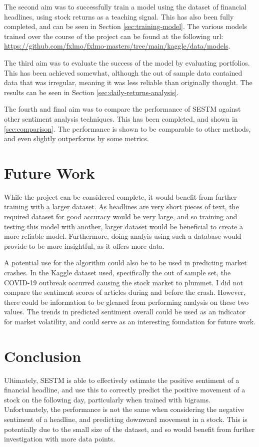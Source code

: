 The second aim was to successfully train a model using the dataset of financial headlines, using stock returns as a teaching signal. This has also been fully completed, and can be seen in Section \ref{sec:training-model}. The various models trained over the course of the project can be found at the following url: \url{https://github.com/fxlmo/fxlmo-masters/tree/main/kaggle/data/models}.

The third aim was to evaluate the success of the model by evaluating portfolios. This has been achieved somewhat, although the out of sample data contained data that was irregular, meaning it was less reliable than originally thought. The results can be seen in Section \ref{sec:daily-returns-analysis}. 

The fourth and final aim was to compare the performance of SESTM against other sentiment analysis techniques. This has been completed, and shown in \ref{sec:comparison}. The performance is shown to be comparable to other methods, and even slightly outperforms by some metrics.

\section{Future Work}
While the project can be considered complete, it would benefit from further training with a larger dataset. As headlines are very short pieces of text, the required dataset for good accuracy would be very large, and so training and testing this model with another, larger dataset would be beneficial to create a more reliable model. Furthermore, doing analyis using such a database would provide to be more insightful, as it offers more data.

A potential use for the algorithm could also be to be used in predicting market crashes. In the Kaggle dataset used, specifically the out of sample set, the COVID-19 outbreak occurred causing the stock market to plummet. I did not compare the sentiment scores of articles during and before the crash. However, there could be information to be gleaned from performing analysis on these two values. The trends in predicted sentiment overall could be used as an indicator for market volatility, and could serve as an interesting foundation for future work.

\section{Conclusion}
Ultimately, SESTM is able to effectively estimate the positive sentiment of a financial headline, and use this to correctly predict the positive movement of a stock on the following day, particularly when trained with bigrams. Unfortunately, the performance is not the same when considering the negative sentiment of a headline, and predicting downward movement in a stock. This is potentially due to the small size of the dataset, and so would benefit from further investigation with more data points.

